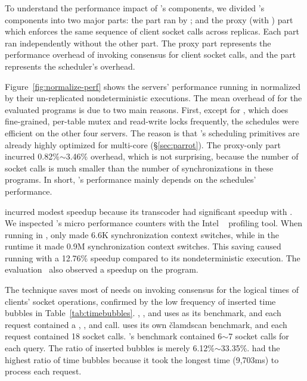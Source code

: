 To understand the performance impact of \xxx's components, we divided \xxx's 
components into two major parts: the \dmt part ran by \parrot; and the proxy 
(with \paxos) part which enforces the same sequence of client socket 
calls across replicas. Each part ran independently without the other 
part. The proxy part represents the performance overhead of invoking \paxos 
consensus for client socket calls, and the \dmt part represents the \parrot 
\dmt scheduler's overhead.

Figure~\ref{fig:normalize-perf} shows the servers' performance running in 
\xxx normalized by their un-replicated nondeterministic executions. The mean 
overhead of \xxx for the \nprog evaluated programs is \overhead 
due to two main reasons. First, except for \mysql, which does fine-grained, 
per-table mutex and read-write locks frequently, the \dmt schedules were 
efficient on the other four servers. The reason is that \parrot's scheduling 
primitives are already highly optimized for multi-core (\S\ref{sec:parrot}). 
The proxy-only part incurred 0.82\%$\sim$3.46\% overhead, which is not 
surprising, because the number of socket calls is much smaller than 
the number of \pthread synchronizations in these programs. In short, \xxx's 
performance mainly depends on the \dmt schedules' performance.

\mediatomb incurred modest speedup because its transcoder \mencoder had 
significant speedup with \parrot. We inspected \mediatomb's micro performance 
counters with the Intel \vtune~\cite{vtune} profiling tool. When running in 
\xxx, \mediatomb only made 6.6K synchronization context switches, while in the 
\pthread runtime it made 0.9M synchronization context switches. This saving 
caused \mediatomb running with \parrot a 12.76\% speedup compared 
to its nondeterministic execution. The \parrot evaluation~\cite{parrot:sosp13} 
also observed a \mencoderspeedup speedup on the \mencoder program. 

The \timealgo technique saves most of needs on invoking consensus 
for the logical times of clients' socket operations, confirmed by the low 
frequency of inserted time bubbles in Table~\ref{tab:timebubbles}. \apache, 
\mediatomb, and \mongoose uses \ab as its benchmark, and each request contained 
a \connect, \send, and \close call. \clamav uses its own \v{clamdscan} 
benchmark, and each request contained 18 socket calls. \mysql's benchmark 
contained 6$\sim$7 socket calls for each query. The ratio of inserted 
bubbles is merely 6.12\%$\sim$33.35\%. \mediatomb had the highest ratio of time 
bubbles because it took the longest time (9,703ms) to process each 
request.

